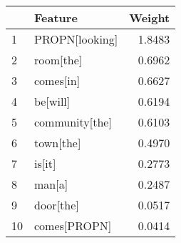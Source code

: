 \begin{tabular}{llr}
\toprule
{} &         Feature &  Weight \\
\midrule
1  &  PROPN[looking] &  1.8483 \\
2  &       room[the] &  0.6962 \\
3  &       comes[in] &  0.6627 \\
4  &        be[will] &  0.6194 \\
5  &  community[the] &  0.6103 \\
6  &       town[the] &  0.4970 \\
7  &          is[it] &  0.2773 \\
8  &          man[a] &  0.2487 \\
9  &       door[the] &  0.0517 \\
10 &    comes[PROPN] &  0.0414 \\
\bottomrule
\end{tabular}
